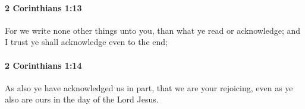 		\paragraph{2 Corinthians 1:13} %
			\label{2CORINTHIANS-1-13}

			For we write none other things unto you, than what ye read or acknowledge; and I trust ye shall acknowledge even to the end;

			\begin{framed}
			\scriptsize
				\begin{compactdesc}
					\item[SBLG] 
				\end{compactdesc}
			\end{framed}

		\paragraph{2 Corinthians 1:14} %
			\label{2CORINTHIANS-1-14}

			As also ye have acknowledged us in part, that we are your rejoicing, even as ye also are ours in the day of the Lord Jesus.

